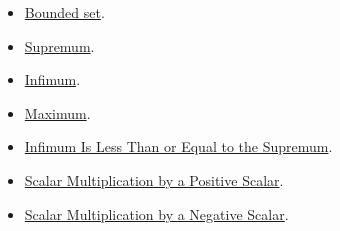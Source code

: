 \begin{dependencies}
\begin{itemize}
  \item \hyperref[def:bounded]{Bounded set}.
  \item \hyperref[def:supremum]{Supremum}.
  \item \hyperref[def:infimum]{Infimum}.
  \item \hyperref[def:maximum]{Maximum}.
  \item \hyperref[thm:infimum-less-than-supremum]{Infimum Is Less Than or Equal to the Supremum}.
  \item \hyperref[thm:scalar-mult-positive]{Scalar Multiplication by a Positive Scalar}.
  \item \hyperref[thm:scalar-mult-negative]{Scalar Multiplication by a Negative Scalar}.
\end{itemize}
\end{dependencies}

\clearpage
